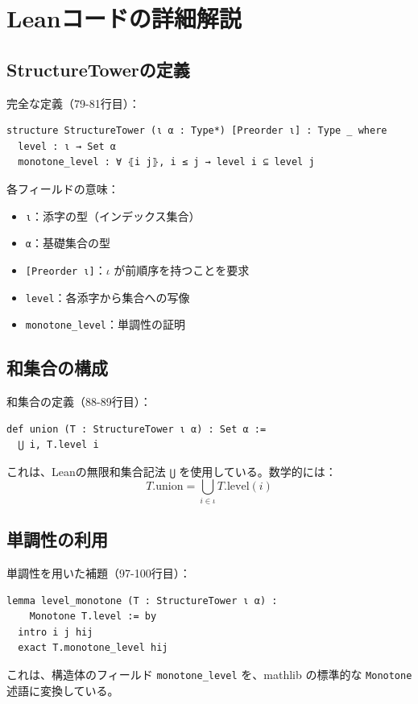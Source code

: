 \documentclass[a4paper,12pt]{ltjsarticle}
\theoremstyle{definition}
\begin{document}
\appendix

\section{Leanコードの詳細解説}

\subsection{StructureTowerの定義}

完全な定義（79-81行目）：
\begin{verbatim}
structure StructureTower (ι α : Type*) [Preorder ι] : Type _ where
  level : ι → Set α
  monotone_level : ∀ ⦃i j⦄, i ≤ j → level i ⊆ level j
\end{verbatim}

各フィールドの意味：
\begin{itemize}
\item \texttt{ι}：添字の型（インデックス集合）
\item \texttt{α}：基礎集合の型
\item \texttt{[Preorder ι]}：$\iota$ が前順序を持つことを要求
\item \texttt{level}：各添字から集合への写像
\item \texttt{monotone\_level}：単調性の証明
\end{itemize}

\subsection{和集合の構成}

和集合の定義（88-89行目）：
\begin{verbatim}
def union (T : StructureTower ι α) : Set α :=
  ⋃ i, T.level i
\end{verbatim}

これは、Leanの無限和集合記法 \texttt{⋃} を使用している。数学的には：
\[
T.\mathrm{union} = \bigcup_{i \in \iota} T.\mathrm{level}(i)
\]

\subsection{単調性の利用}

単調性を用いた補題（97-100行目）：
\begin{verbatim}
lemma level_monotone (T : StructureTower ι α) :
    Monotone T.level := by
  intro i j hij
  exact T.monotone_level hij
\end{verbatim}

これは、構造体のフィールド \texttt{monotone\_level} を、mathlib の標準的な \texttt{Monotone} 述語に変換している。
\end{document}
